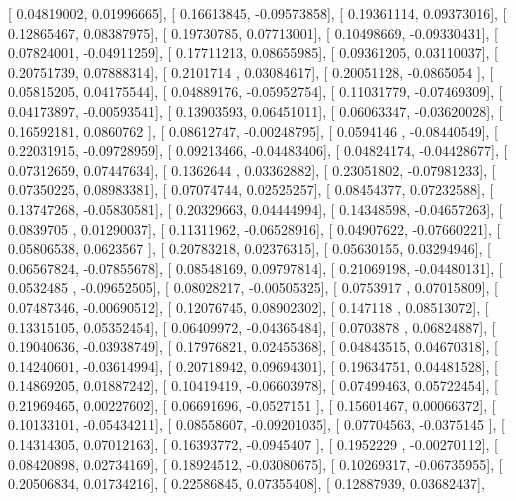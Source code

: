 \documentclass{article}
\begin{document}
       [ 0.04819002,  0.01996665],
       [ 0.16613845, -0.09573858],
       [ 0.19361114,  0.09373016],
       [ 0.12865467,  0.08387975],
       [ 0.19730785,  0.07713001],
       [ 0.10498669, -0.09330431],
       [ 0.07824001, -0.04911259],
       [ 0.17711213,  0.08655985],
       [ 0.09361205,  0.03110037],
       [ 0.20751739,  0.07888314],
       [ 0.2101714 ,  0.03084617],
       [ 0.20051128, -0.0865054 ],
       [ 0.05815205,  0.04175544],
       [ 0.04889176, -0.05952754],
       [ 0.11031779, -0.07469309],
       [ 0.04173897, -0.00593541],
       [ 0.13903593,  0.06451011],
       [ 0.06063347, -0.03620028],
       [ 0.16592181,  0.0860762 ],
       [ 0.08612747, -0.00248795],
       [ 0.0594146 , -0.08440549],
       [ 0.22031915, -0.09728959],
       [ 0.09213466, -0.04483406],
       [ 0.04824174, -0.04428677],
       [ 0.07312659,  0.07447634],
       [ 0.1362644 ,  0.03362882],
       [ 0.23051802, -0.07981233],
       [ 0.07350225,  0.08983381],
       [ 0.07074744,  0.02525257],
       [ 0.08454377,  0.07232588],
       [ 0.13747268, -0.05830581],
       [ 0.20329663,  0.04444994],
       [ 0.14348598, -0.04657263],
       [ 0.0839705 ,  0.01290037],
       [ 0.11311962, -0.06528916],
       [ 0.04907622, -0.07660221],
       [ 0.05806538,  0.0623567 ],
       [ 0.20783218,  0.02376315],
       [ 0.05630155,  0.03294946],
       [ 0.06567824, -0.07855678],
       [ 0.08548169,  0.09797814],
       [ 0.21069198, -0.04480131],
       [ 0.0532485 , -0.09652505],
       [ 0.08028217, -0.00505325],
       [ 0.0753917 ,  0.07015809],
       [ 0.07487346, -0.00690512],
       [ 0.12076745,  0.08902302],
       [ 0.147118  ,  0.08513072],
       [ 0.13315105,  0.05352454],
       [ 0.06409972, -0.04365484],
       [ 0.0703878 ,  0.06824887],
       [ 0.19040636, -0.03938749],
       [ 0.17976821,  0.02455368],
       [ 0.04843515,  0.04670318],
       [ 0.14240601, -0.03614994],
       [ 0.20718942,  0.09694301],
       [ 0.19634751,  0.04481528],
       [ 0.14869205,  0.01887242],
       [ 0.10419419, -0.06603978],
       [ 0.07499463,  0.05722454],
       [ 0.21969465,  0.00227602],
       [ 0.06691696, -0.0527151 ],
       [ 0.15601467,  0.00066372],
       [ 0.10133101, -0.05434211],
       [ 0.08558607, -0.09201035],
       [ 0.07704563, -0.0375145 ],
       [ 0.14314305,  0.07012163],
       [ 0.16393772, -0.0945407 ],
       [ 0.1952229 , -0.00270112],
       [ 0.08420898,  0.02734169],
       [ 0.18924512, -0.03080675],
       [ 0.10269317, -0.06735955],
       [ 0.20506834,  0.01734216],
       [ 0.22586845,  0.07355408],
       [ 0.12887939,  0.03682437],
\end{document}
